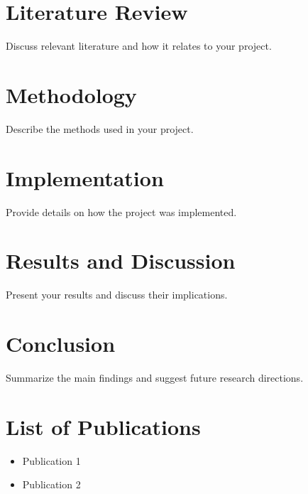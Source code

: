 \documentclass[a4paper,12pt]{report}
\begin{document}
\chapter{Literature Review}
Discuss relevant literature and how it relates to your project.

\newpage

\chapter{Methodology}
Describe the methods used in your project.

\newpage

\chapter{Implementation}
Provide details on how the project was implemented.

\newpage

\chapter{Results and Discussion}
Present your results and discuss their implications.

\newpage

\chapter{Conclusion}
Summarize the main findings and suggest future research directions.

\newpage


\newpage

\chapter*{List of Publications}
\begin{itemize}
    \item Publication 1
    \item Publication 2
\end{itemize}

\newpage

\printindex
\end{document}
